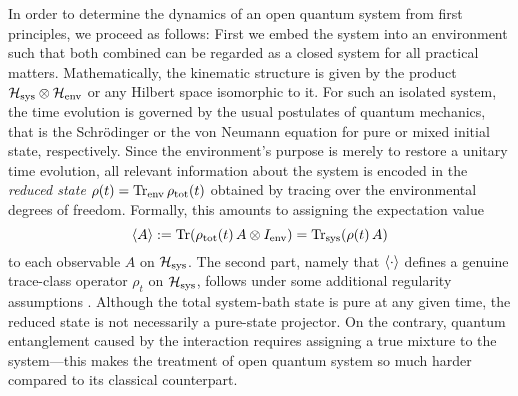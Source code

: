 In order to determine the dynamics of an open quantum system from first principles, we proceed as follows:
First we embed the system into an environment such that both combined can be regarded as a closed system for all practical matters.
Mathematically, the kinematic structure is given by the product $\mathcal{H}_\mathrm{sys}\otimes\mathcal{H}_\mathrm{env}$ or any Hilbert space isomorphic to it.
For such an isolated system, the time evolution is governed by the usual postulates of quantum mechanics, that is the Schrödinger or the von Neumann equation for pure or mixed initial state, respectively.
Since the environment's purpose is merely to restore a unitary time evolution, all relevant information about the system is encoded in the \emph{reduced state} $\rho(t) = \operatorname{Tr}_\mathrm{env} \rho_\mathrm{tot}(t)$ obtained by tracing over the environmental degrees of freedom.
Formally, this amounts to assigning the expectation value
\begin{equation}
  \langle A \rangle := \operatorname{Tr}(\rho_\mathrm{tot}(t) \, A\otimes I_\mathrm{env}) = \operatorname{Tr}_\mathrm{sys}(\rho(t) \, A)
  \label{eq:intro.reduced_state}
\end{equation}
to each observable $A$ on $\mathcal{H}_\mathrm{sys}$.
The second part, namely that $\langle \cdot \rangle$ defines a genuine trace-class operator $\rho_t$ on $\mathcal{H}_\mathrm{sys}$, follows under some additional regularity assumptions \cite{BrRo03_operator_algebras}.
Although the total system-bath state is pure at any given time, the reduced state is not necessarily a pure-state projector.
On the contrary, quantum entanglement caused by the interaction requires assigning a true mixture to the system---this makes the treatment of open quantum system so much harder compared to its classical counterpart.\\




